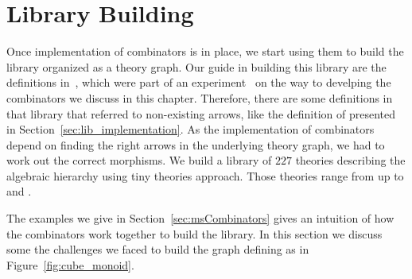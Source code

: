 \section{Library Building}
\label{sec:guidelines}
Once implementation of combinators is in place, we start using them to build the library organized as a theory graph. Our guide in building this library are the definitions in~\cite{msLibDecls}, which were part of an experiment~\cite{mathscheme2011experiments} on the way to develping the combinators we discuss in this chapter. Therefore, there are some definitions in that library that referred to non-existing arrows, like the definition of  presented in Section~\ref{sec:lib_implementation}. As the implementation of combinators depend on finding the right arrows in the underlying theory graph, we had to work out the correct morphisms. We build a library of $227$ theories describing the algebraic hierarchy using tiny theories approach. Those theories range from  up to  and  .
 
The examples we give in Section~\ref{sec:msCombinators} gives an intuition of how the combinators work together to build the library. In this section we discuss some the challenges we faced to build the graph defining  as in Figure~\ref{fig:cube_monoid}.  

